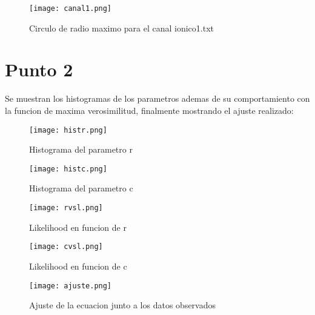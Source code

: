 \documentclass[12pt]{article}
\begin{document}
\begin{figure}[!h]
\centering
\texttt{[image: canal1.png]}
\caption{Circulo de radio maximo para el canal ionico1.txt}
\end{figure}

\section{Punto 2}

Se muestran los histogramas de los parametros ademas de su comportamiento con la funcion de maxima verosimilitud, finalmente mostrando el ajuste realizado:

\begin{figure}[!h]
\centering
\texttt{[image: histr.png]}
\caption{Histograma del parametro r}
\end{figure}

\begin{figure}[!h]
\centering
\texttt{[image: histc.png]}
\caption{Histograma del parametro c}
\end{figure}


\begin{figure}[!h]
\centering
\texttt{[image: rvsl.png]}
\caption{Likelihood en funcion de r}
\end{figure}

\begin{figure}[!h]
\centering
\texttt{[image: cvsl.png]}
\caption{Likelihood en funcion de c}
\end{figure}


\begin{figure}[!h]
\centering
\texttt{[image: ajuste.png]}
\caption{Ajuste de la ecuacion junto a los datos observados}
\end{figure}
\end{document}
